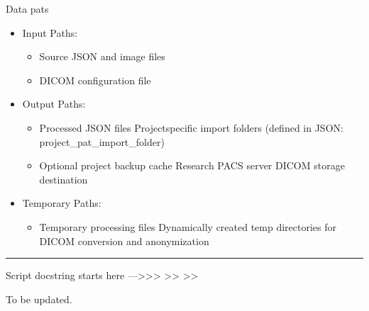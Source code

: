 \documentclass[letterpaper,10pt,english]{sphinxmanual}
\begin{document}
\sphinxAtStartPar
Data pats
\begin{itemize}
\item {} 
\sphinxAtStartPar
Input Paths:
\begin{itemize}
\item {} 
\sphinxAtStartPar
{} \sphinxhyphen{} Source JSON and image files

\item {} 
\sphinxAtStartPar
{} \sphinxhyphen{} DICOM configuration file

\end{itemize}

\item {} 
\sphinxAtStartPar
Output Paths:
\begin{itemize}
\item {} 
\sphinxAtStartPar
{} \sphinxhyphen{} Processed JSON files Project\sphinxhyphen{}specific import folders (defined in JSON: project\_pat\_import\_folder)

\item {} 
\sphinxAtStartPar
{} \sphinxhyphen{} Optional project backup cache Research PACS server \sphinxhyphen{} DICOM storage destination

\end{itemize}

\item {} 
\sphinxAtStartPar
Temporary Paths:
\begin{itemize}
\item {} 
\sphinxAtStartPar
{} \sphinxhyphen{} Temporary processing files Dynamically created temp directories for DICOM conversion and anonymization

\end{itemize}

\end{itemize}


\bigskip\hrule\bigskip


\sphinxAtStartPar
Script docstring starts here —\textgreater{}\textgreater{}\textgreater{}
\textendash{}\textgreater{}\textgreater{}
\textendash{}\textgreater{}\textgreater{}

\sphinxAtStartPar
To be updated.

\sphinxstepscope
\end{document}
